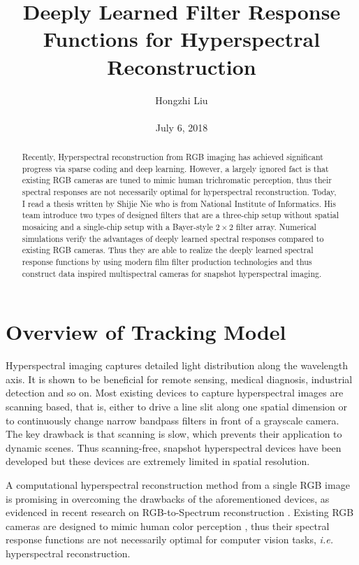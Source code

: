 \documentclass[10pt,twocolumn,letterpaper]{article}
\title{Deeply Learned Filter Response Functions for Hyperspectral Reconstruction}
\author{Hongzhi Liu\\\\
July 6, 2018}
\begin{document}
\maketitle
\begin{abstract}
	Recently, Hyperspectral reconstruction from RGB imaging has achieved significant progress via sparse coding and deep learning. However, a largely ignored fact is that existing RGB cameras are tuned to mimic human trichromatic perception, thus their spectral responses are not necessarily optimal for hyperspectral reconstruction. Today, I read a thesis written by Shijie Nie who is from National Institute of Informatics. His team introduce two types of designed filters that are a three-chip setup without spatial mosaicing and a single-chip setup with a Bayer-style $2\times 2$ filter array. Numerical simulations verify the advantages of deeply learned spectral responses compared to existing RGB cameras. Thus they are able to realize the deeply learned spectral response functions by using modern film filter production technologies and thus construct data inspired multispectral cameras for snapshot hyperspectral imaging.
\end{abstract}
\section{Overview of Tracking Model}

Hyperspectral imaging captures detailed light distribution along the wavelength axis. It is shown to be beneficial for remote sensing, medical diagnosis, industrial detection and so on. Most existing devices to capture hyperspectral images are scanning based, that is, either to drive a line slit along one spatial dimension or to continuously change narrow bandpass filters in front of a grayscale camera. The key drawback is that scanning is slow, which prevents their application to dynamic scenes. Thus scanning-free, snapshot hyperspectral devices have been developed but these devices are extremely limited in spatial resolution.

A computational hyperspectral reconstruction method from a single RGB image is promising in overcoming the drawbacks of the aforementioned devices, as evidenced in recent research on RGB-to-Spectrum reconstruction \cite{Alvarez2018Adversarial}. Existing RGB cameras are designed to mimic human color perception \cite{Gu2013What}, thus their spectral response functions are not necessarily optimal for computer vision tasks, \emph{i.e.} hyperspectral reconstruction. 
\end{document}
